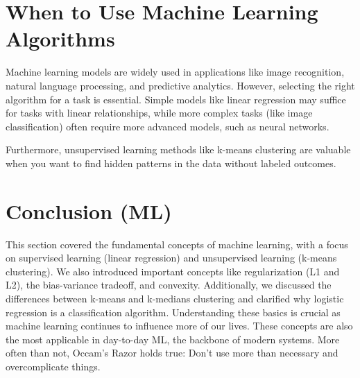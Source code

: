 \section{When to Use Machine Learning Algorithms}
    \large Machine learning models are widely used in applications like image recognition, natural language processing, and predictive analytics. However, selecting the right algorithm for a task is essential. Simple models like linear regression may suffice for tasks with linear relationships, while more complex tasks (like image classification) often require more advanced models, such as neural networks.
    
    Furthermore, unsupervised learning methods like k-means clustering are valuable when you want to find hidden patterns in the data without labeled outcomes.

\section{Conclusion (ML)}
    \large This section covered the fundamental concepts of machine learning, with a focus on supervised learning (linear regression) and unsupervised learning (k-means clustering). We also introduced important concepts like regularization (L1 and L2), the bias-variance tradeoff, and convexity. Additionally, we discussed the differences between k-means and k-medians clustering and clarified why logistic regression is a classification algorithm. Understanding these basics is crucial as machine learning continues to influence more of our lives. These concepts are also the most applicable in day-to-day ML, the backbone of modern systems. More often than not, Occam's Razor holds true: Don't use more than necessary and overcomplicate things.
